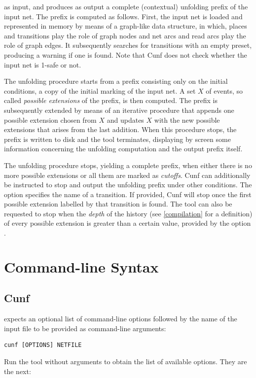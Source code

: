 \documentclass[a4paper]{refart}
\begin{document}
as input, and produces as output
a complete (contextual) unfolding prefix of the input net.
The prefix is computed as follows.
First, the input net is loaded and represented in
memory by means of a graph-like data structure, in which, places and
transitions play the role of graph nodes and net arcs and read arcs play
the role of graph edges.  It subsequently searches for transitions with an
empty preset, producing a warning if one is found.  Note that Cunf does not
check whether the input net is 1-safe or not.

The unfolding procedure starts from a prefix consisting only on the initial
conditions, a copy of the initial marking of the input net.  A set $X$ of
events, so called \textit{possible extensions} of the prefix, is then
computed.  The prefix is subsequently extended by means of an iterative
procedure that appends one possible extension chosen from $X$ and updates
$X$ with the new possible extensions that arises from the last addition.
When this procedure stops, the prefix is written to disk and the tool
terminates, displaying by screen some information concerning the unfolding
computation and the output prefix itself.

The unfolding procedure stops, yielding a complete prefix, when either
there is no more possible extensions or all them are marked as
\textit{cutoffs}.  Cunf can additionally be instructed to stop and output
the unfolding prefix under other conditions.  The option 
specifies the name of a transition.  If provided, Cunf will stop once the
first possible extension labelled by that transition is found.  The tool
can also be requested to stop when the \textit{depth} of the history (see
\cref{compilation} for a definition) of every possible extension is greater
than a certain value, provided by the option .

\fi%
\section{Command-line Syntax}%
\subsection{Cunf}%

\cunf expects an optional list of command-line options followed by the
name of the input file to be provided as command-line arguments:
\begin{verbatim}
cunf [OPTIONS] NETFILE
\end{verbatim}
Run the tool without arguments to obtain the list of available options.
They are the next:
\end{document}
